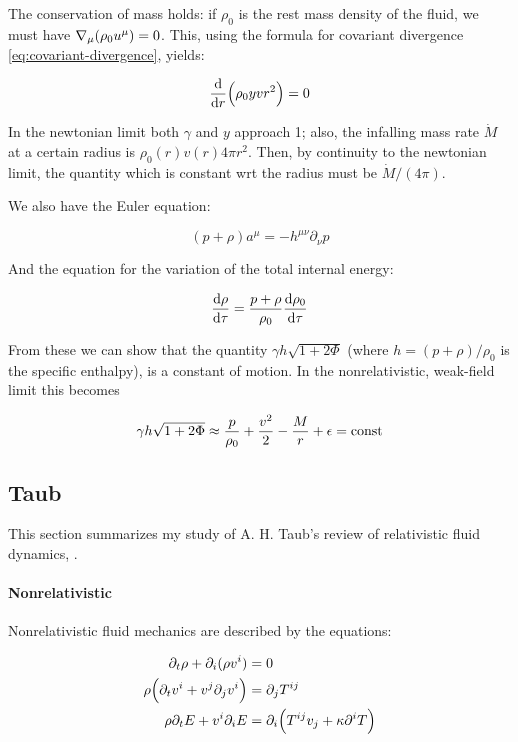 \documentclass[main.tex]{subfiles}
\begin{document}
The conservation of mass holds: if $\rho_0$ is the rest mass density of the fluid, we must have $\nabla_\mu \qty(\rho_0 u^\mu) =0$. This, using the formula for covariant divergence \eqref{eq:covariant-divergence}, yields:

\begin{equation}
    \dv{}{r} \qty(\rho_0 yvr^2) = 0
\end{equation}

In the newtonian limit both $\gamma$ and $y$ approach 1; also, the infalling mass rate $\Dot{M}$ at a certain radius is $\rho_0 (r) v(r) 4\pi r^2$. Then, by continuity to the newtonian limit, the quantity which is constant wrt the radius must be $\Dot{M} / (4\pi)$.

We also have the Euler equation:

\begin{equation}
    (p+\rho) a^\mu = - h^{\mu \nu} \partial_\nu p
\end{equation}

And the equation for the variation of the total internal energy:

\begin{equation}
    \dv{\rho}{\tau} = \frac{p+\rho}{\rho_0} \dv{\rho_0}{\tau}
\end{equation}

From these we can show that the quantity $\gamma h \sqrt{1+2\Phi} $ (where $h = (p+\rho)/\rho_0$ is the specific enthalpy), is a constant of motion.
In the nonrelativistic, weak-field limit this  becomes

\begin{equation}
    \gamma h \sqrt{1+2\Phi} \approx \frac{p}{\rho_0} + \frac{v^2}{2} - \frac{M}{r} + \epsilon = \const
\end{equation}


\subsection{Taub}

This section summarizes my study of A. H. Taub's review of relativistic fluid dynamics, \cite{taub}.

\paragraph{Nonrelativistic}

Nonrelativistic fluid mechanics are described by the equations:

\begin{subequations}
\begin{align}
    \partial_t \rho + \partial_i (\rho v^i) &= 0 \\
    \rho \qty(\partial_t v^i + v^j \partial_j v^i) &= \partial_j T^{ij} \\
    \rho \partial_t E + v^i \partial_i E &= \partial_i \qty(T^{ij}v_j + \kappa\partial^i T)
\end{align}
\end{subequations}
\end{document}
